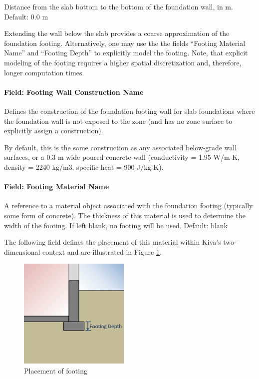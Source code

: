 Distance from the slab bottom to the bottom of the foundation wall, in
m. Default: 0.0 m

Extending the wall below the slab provides a coarse approximation of the
foundation footing. Alternatively, one may use the the fields ``Footing
Material Name'' and ``Footing Depth'' to explicitly model the footing.
Note, that explicit modeling of the footing requires a higher spatial
discretization and, therefore, longer computation times.

\paragraph{Field: Footing Wall Construction
Name}

Defines the construction of the foundation footing wall for slab foundations where the foundation wall is not exposed
to the zone (and has no zone surface to explicitly assign a
construction).

By default, this is the same construction as any associated below-grade
wall surfaces, or a 0.3 m wide poured concrete wall (conductivity = 1.95
W/m-K, density = 2240 kg/m3, specific heat = 900 J/kg-K).

\paragraph{Field: Footing Material
Name}

A reference to a material object associated with the foundation footing
(typically some form of concrete). The thickness of this material is
used to determine the width of the footing. If left blank, no footing
will be used. Default: blank

The following field defines the placement of this material within Kiva's
two-dimensional context and are illustrated in Figure \ref{fig:foot}.

\begin{figure}
\centering
\includegraphics{media/kiva-2d-footing.png}
\caption{Placement of footing\label{fig:foot}}
\end{figure}

